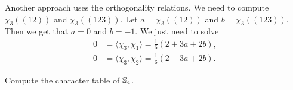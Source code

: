 \begin{example}
	Another approach uses the orthogonality relations. We need to compute $\chi_3( (12) )$ and $\chi_3( (123))$. 
	Let $a=\chi_3( (12) )$ and $b=\chi_3( (123))$. Then 
    we get that $a=0$ and $b=-1$. We just need to solve  
	\begin{align*}
		0&=\langle \chi_3,\chi_1\rangle=\frac16(2+3a+2b),\\
		0&=\langle \chi_3,\chi_2\rangle=\frac16(2-3a+2b).
	\end{align*}
	



\end{example}

\begin{exercise}
Compute the character table of $\mathbb{S}_4$. 
\end{exercise}

